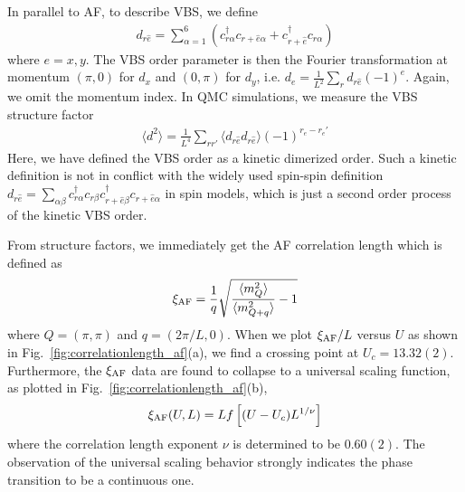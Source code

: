 \documentclass[twocolumn,superscriptaddress]{revtex4-1}
\begin{document}
In parallel to AF, to describe VBS, we define
\begin{eqnarray}
  d_{r\hat{e}}=\sum_{\alpha=1}^{6}\left(c_{r\alpha}^\dag c_{r+\hat{e}\alpha} + c_{r+\hat{e}}^\dag c_{r\alpha} \right)
\end{eqnarray}
where $e=x,y$. The VBS order parameter is then the Fourier transformation at momentum $(\pi,0)$ for $d_x$ and $(0,\pi)$ for $d_y$, i.e. $d_e=\frac{1}{L^2}\sum_r d_{r\hat{e}}(-1)^e$. Again, we omit the momentum index. In QMC simulations, we measure the VBS structure factor 
\begin{eqnarray}
  \langle d^2 \rangle=\frac{1}{L^4}\sum_{rr'} \langle d_{r\hat{e}}d_{r\hat{e}}\rangle (-1)^{r_e-r_e'}
\end{eqnarray}
Here, we have defined the VBS order as a kinetic dimerized order. Such a kinetic definition is not in conflict with the widely used spin-spin definition $d_{r\hat{e}}=\sum_{\alpha\beta}c_{r\alpha}^\dag c_{r\beta} c_{r+\hat{e}\beta}^\dag c_{r+\hat{e}\alpha}$ in spin models, which is just a second order process of the kinetic VBS order.




From structure factors, we immediately get the AF correlation length which is defined as \cite{Sandvik2010a}
\begin{eqnarray}
  \xi_{\rm AF}=\frac{1}{q}\sqrt{\frac{\langle m_Q^2 \rangle}{\langle m_{Q+q}^2 \rangle}-1}
\end{eqnarray}
where $Q=(\pi,\pi)$ and $q=(2\pi/L,0)$. When we plot $\xi_{\rm AF}/L$ versus $U$ as shown in Fig.~\ref{fig:correlationlength_af}(a), we find a crossing point at $U_c=13.32(2)$. Furthermore, the $\xi_{\rm AF}$ data are found to collapse to a universal scaling function, as plotted in Fig.~\ref{fig:correlationlength_af}(b), 
\begin{eqnarray}\label{eq:scalinghypothesis}
  \xi_{\rm AF}(U,L)=L f\left[(U-U_c)L^{1/\nu}\right] 
\end{eqnarray}
where the correlation length exponent $\nu$ is determined to be $0.60(2)$. The observation of the universal scaling behavior strongly indicates the phase transition to be a continuous one. 
\end{document}
